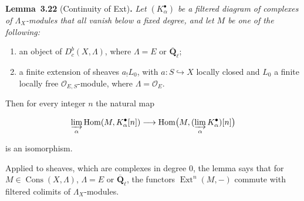 \documentclass[11pt]{article}
\newenvironment{bpstatement}[2]{\par\addvspace{0.6\baselineskip}\noindent\textbf{#1}#2\textbf{.}\enspace\ignorespaces}
  {\par\addvspace{0.4\baselineskip}}
\newenvironment{bpstatementit}[2]{\begin{bpstatement}{#1}{#2}\itshape\ignorespaces}{\end{bpstatement}}
\providecommand{\Cons}{}\renewcommand{\Cons}{\operatorname{Cons}}
\providecommand{\Dbc}{}\renewcommand{\Dbc}{D^b_c}
\providecommand{\Ext}{}\renewcommand{\Ext}{\operatorname{Ext}}
\providecommand{\Hom}{}\renewcommand{\Hom}{\operatorname{Hom}}
\begin{document}
\label{bp68}%
\begin{bpstatementit}{Lemma~3.22}{ (Continuity of Ext)}
Let \((K_\alpha^\bullet)\) be a filtered diagram of complexes of \(\Lambda_X\)-modules that all vanish below a fixed degree, and let \(M\) be one of the following:

\begin{enumerate}
\item an object of \(\Dbc(X,\Lambda)\), where \(\Lambda=E\) or \(\overline{\mathbf Q}_\ell\);
\item a finite extension of sheaves \(a_!L_0\), with \(a:S\hookrightarrow X\) locally closed and \(L_0\) a finite locally free \(\mathcal O_{E,S}\)-module, where \(\Lambda=\mathcal O_E\).
\end{enumerate}

Then for every integer \(n\) the natural map

\[
\varinjlim_\alpha\Hom(M,K_\alpha^\bullet[n])
\longrightarrow
\Hom\bigl(M,(\varinjlim_\alpha K_\alpha^\bullet)[n]\bigr)
\]

is an isomorphism.
\end{bpstatementit}

\label{bp69}%
Applied to sheaves, which are complexes in degree \(0\), the lemma says that for \(M\in\Cons(X,\Lambda)\), \(\Lambda=E\) or \(\overline{\mathbf Q}_\ell\), the functors \(\Ext^n(M,-)\) commute with filtered colimits of \(\Lambda_X\)-modules.
\end{document}
